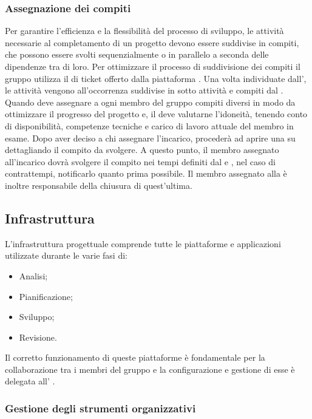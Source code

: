 \subsubsection{Assegnazione dei compiti}
Per garantire l'efficienza e la flessibilità del processo di sviluppo, le attività necessarie al completamento di un progetto devono essere suddivise in compiti, che possono essere svolti sequenzialmente o in parallelo a seconda delle dipendenze tra di loro. Per ottimizzare il processo di suddivisione dei compiti il gruppo utilizza il  di ticket offerto dalla piattaforma .
Una volta individuate dall'\ana{}, le attività vengono all'occorrenza suddivise in sotto attività e compiti dal \RdP{}. Quando deve assegnare a ogni membro del gruppo compiti diversi in modo da ottimizzare il progresso del progetto e, il \RdP{} deve valutarne l'idoneità, tenendo conto di disponibilità, competenze tecniche e carico di lavoro attuale del membro in esame.  Dopo aver deciso a chi assegnare l'incarico,  procederà ad aprire una  su  dettagliando il compito da svolgere. A questo punto, il membro assegnato all'incarico dovrà svolgere il compito nei tempi definiti dal \RdP{} e , nel caso di contrattempi, notificarlo quanto prima possibile. Il membro assegnato alla  è inoltre responsabile della chiusura di quest'ultima.

\subsection{Infrastruttura}
L'infrastruttura progettuale comprende tutte le piattaforme e applicazioni utilizzate durante le varie fasi di:
\begin{itemize}
\item Analisi;
\item Pianificazione;
\item Sviluppo;
\item Revisione.
\end{itemize}
Il corretto funzionamento di queste piattaforme è fondamentale per la collaborazione tra i membri del gruppo e la configurazione e gestione di esse è delegata all' \adm{}.

\subsubsection{Gestione degli strumenti organizzativi}

